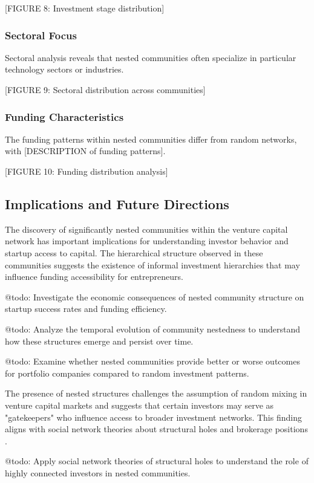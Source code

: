 \documentclass[12pt]{article}
\begin{document}
[FIGURE 8: Investment stage distribution]

\subsubsection{Sectoral Focus}

Sectoral analysis reveals that nested communities often specialize in particular technology sectors or industries.

[FIGURE 9: Sectoral distribution across communities]

\subsubsection{Funding Characteristics}

The funding patterns within nested communities differ from random networks, with [DESCRIPTION of funding patterns].

[FIGURE 10: Funding distribution analysis]

\subsection{Implications and Future Directions}

The discovery of significantly nested communities within the venture capital network has important implications for understanding investor behavior and startup access to capital. The hierarchical structure observed in these communities suggests the existence of informal investment hierarchies that may influence funding accessibility for entrepreneurs.

@todo: Investigate the economic consequences of nested community structure on startup success rates and funding efficiency.

@todo: Analyze the temporal evolution of community nestedness to understand how these structures emerge and persist over time.

@todo: Examine whether nested communities provide better or worse outcomes for portfolio companies compared to random investment patterns.

The presence of nested structures challenges the assumption of random mixing in venture capital markets and suggests that certain investors may serve as "gatekeepers" who influence access to broader investment networks. This finding aligns with social network theories about structural holes and brokerage positions \cite{Borgatti2011}.

@todo: Apply social network theories of structural holes to understand the role of highly connected investors in nested communities.
\end{document}
